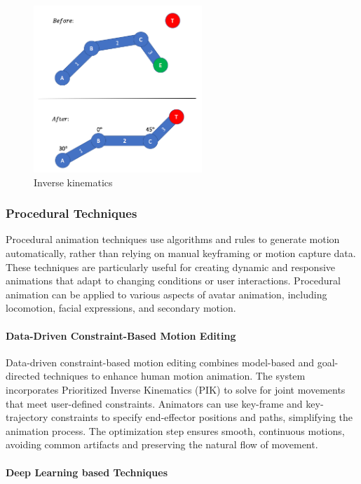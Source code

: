 \documentclass[../../main.tex]{subfiles}
\begin{document}
\begin{figure}
  \centering \includegraphics[width = 2.5in]{chapters/background_work/images/inverse_kinematics_example.png}
  \caption{Inverse kinematics}
  \label{fig:inverse_kinematics_example}
\end{figure}

\subsubsection{Procedural Techniques}

Procedural animation techniques use algorithms and rules to generate motion automatically, rather than relying on manual keyframing or motion capture data. These techniques are particularly useful for creating dynamic and responsive animations that adapt to changing conditions or user interactions. Procedural animation can be applied to various aspects of avatar animation, including locomotion, facial expressions, and secondary motion.


\paragraph{Data-Driven Constraint-Based Motion Editing}

Data-driven constraint-based motion editing\cite{inbook} combines model-based and goal-directed techniques to enhance human motion animation. The system incorporates Prioritized Inverse Kinematics (PIK) to solve for joint movements that meet user-defined constraints. Animators can use key-frame and key-trajectory constraints to specify end-effector positions and paths, simplifying the animation process. The optimization step ensures  smooth, continuous motions, avoiding common artifacts and preserving the natural flow of movement. 

\paragraph{Deep Learning based Techniques}
\end{document}
